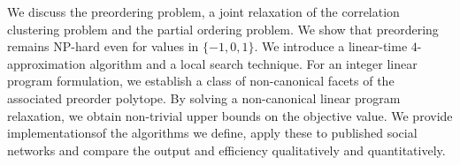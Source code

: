 We discuss the preordering problem, a joint relaxation of the correlation clustering problem and the partial ordering problem. 
We show that preordering remains \textsc{NP}-hard even for values in $\{-1,0,1\}$.
We introduce a linear-time $4$-approximation algorithm and a local search technique.
For an integer linear program formulation, we establish a class of non-canonical facets of the associated preorder polytope.
By solving a non-canonical linear program relaxation, we obtain non-trivial upper bounds on the objective value.
We provide implementations\footnotemark[2] of the algorithms we define, apply these to published social networks and compare the output and efficiency qualitatively and quantitatively.

